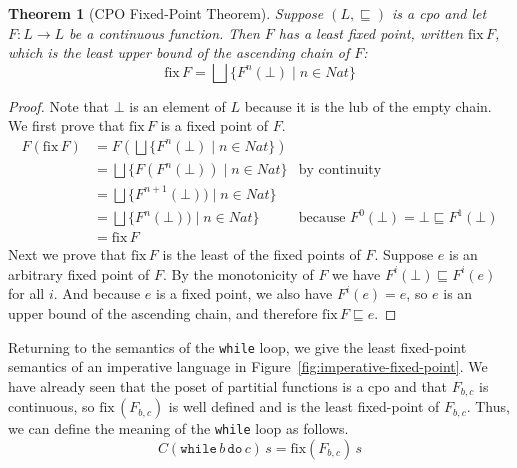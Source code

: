 \documentclass{tufte-handout}
\newcommand{\WHILE}[2]{\mathtt{while}\,#1\,\mathtt{do}\,#2}
\newcommand{\NAT}[0]{\ensuremath{\mathit{Nat}}}
\newtheorem{theorem}{Theorem}%
\begin{document}
\begin{theorem}[CPO Fixed-Point Theorem]\label{thm:fixed-point}
Suppose $(L,\sqsubseteq)$ is a cpo and let $F:L\to L$ be a continuous
function. Then $F$ has a least fixed point, written $\mathrm{fix}\,F$,
which is the least upper bound of the ascending chain of $F$:
\[
  \mathrm{fix}\,F = \bigsqcup \{ F^n(\bot) \mid n \in \mathit{Nat} \}
\]
\end{theorem}
\begin{proof}
Note that $\bot$ is an element of $L$ because it is the lub of the
empty chain.  We first prove that $\mathrm{fix}\,F$ is a fixed point
of $F$.
\begin{align*}
  F(\mathrm{fix}\,F) &= F(\bigsqcup \{ F^n(\bot) \mid n \in \NAT \})\\
  &= \bigsqcup\{ F(F^n(\bot)) \mid n \in \NAT \} & \text{by continuity}\\
  &= \bigsqcup\{ F^{n+1}(\bot)) \mid n \in \NAT \} \\
  &= \bigsqcup\{ F^n(\bot)) \mid n \in \NAT \} 
  & \text{because } F^0(\bot) = \bot \sqsubseteq F^1(\bot)  \\
  &= \mathrm{fix}\,F
\end{align*}
Next we prove that $\mathrm{fix}\,F$ is the least of the fixed points
of $F$. Suppose $e$ is an arbitrary fixed point of $F$. By the
monotonicity of $F$ we have $F^i(\bot) \sqsubseteq F^i(e)$ for all
$i$.  And because $e$ is a fixed point, we also have $F^i(e) = e$, so
$e$ is an upper bound of the ascending chain, and therefore
$\mathrm{fix}\,F \sqsubseteq e$.
\end{proof}


Returning to the semantics of the \texttt{while} loop, we give the
least fixed-point semantics of an imperative language in
Figure~\ref{fig:imperative-fixed-point}. We have already seen that the
poset of partitial functions is a cpo and that $F_{b,c}$ is
continuous, so $\mathrm{fix}\,(F_{b,c})$ is well defined and is the
least fixed-point of $F_{b,c}$. Thus, we can define the meaning
of the \texttt{while} loop as follows.
\[
  C(\WHILE{b}{c})\,s = \mathrm{fix}(F_{b,c})\,s
\]
\end{document}
